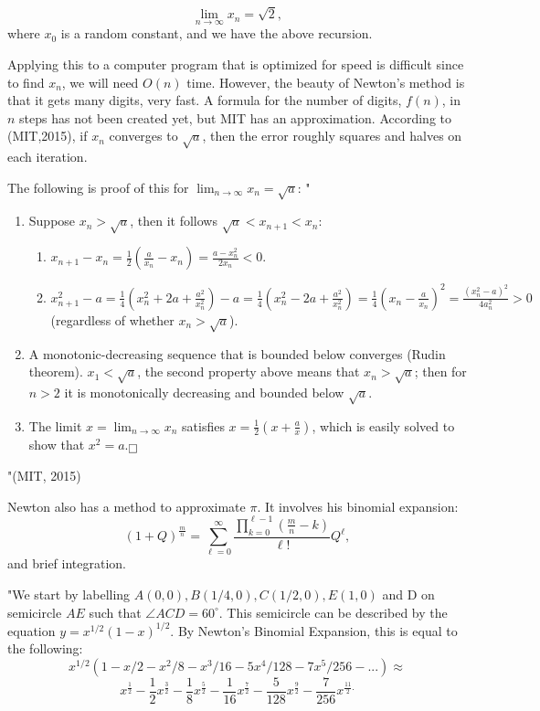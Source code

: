 \documentclass{article}
\begin{document}
$$\lim_{n\to \infty}x_n=\sqrt{2},$$
where $x_0$ is a random constant, and we have the above recursion. 
\par Applying this to a computer program that is optimized for speed is difficult since to find $x_n$, we will need $O(n)$ time. However, the beauty of Newton's method is that it gets many digits, very fast. A formula for the number of digits, $f(n)$, in $n$ steps has not been created yet, but MIT has an approximation. According to (MIT,2015), if $x_n$ converges to $\sqrt{a}$, then the error roughly squares and halves on each iteration.
\par The following is proof of this for $\lim_{n\to\infty}x_n=\sqrt{a}$: 
"\begin{enumerate}
    \item Suppose $x_n>\sqrt{a}$, then it follows $\sqrt{a}<x_{n+1}<x_n$:
        \begin{enumerate}
            \item $x_{n+1}-x_n=\frac{1}{2}(\frac{a}{x_n}-x_n)=\frac{a-x_n^2}{2x_n}<0$.
            \item $x_{n+1}^2-a=\frac{1}{4}(x_n^2+2a+\frac{a^2}{x_n^2})-a=\frac{1}{4}(x_n^2-2a+\frac{a^2}{x_n^2})=\frac{1}{4}(x_n-\frac{a}{x_n})^2=\frac{(x_n^2-a)^2}{4a_n^2}>0$ (regardless of whether $x_n>\sqrt{a}$). 
        \end{enumerate}
    \item A monotonic-decreasing sequence that is bounded below converges (Rudin theorem). $x_1<\sqrt{a}$, the second property above means that $x_n>\sqrt{a}$; then for $n>2$ it is monotonically decreasing and bounded below $\sqrt{a}$.
    \item The limit $x=\lim_{n\to\infty}x_n$ satisfies $x=\frac{1}{2}(x+\frac{a}{x})$, which is easily solved to show that $x^2=a$.$\fbox{}$
\end{enumerate}"(MIT, 2015)
\par Newton also has a method to approximate $\pi$. It involves his binomial expansion:
$$(1+Q)^{\frac{m}{n}}=\sum_{\ell=0}^{\infty}\frac{\prod_{k=0}^{\ell-1}(\frac{m}{n}-k)}{\ell!}Q^{\ell},$$
and brief integration.
\par "We start by labelling $A(0,0), B(1/4,0), C(1/2,0), E(1,0)$ and D on semicircle $AE$ such that $\angle ACD=60^{\circ}$. This semicircle can be described by the equation $y=x^{1/2}(1-x)^{1/2}$. By Newton's Binomial Expansion, this is equal to the following:
$$x^{1/2}(1-x/2-x^2/8-x^3/16-5x^4/128-7x^5/256-...)\approx$$
$$x^{\frac{1}{2}}-\frac{1}{2}x^{\frac{3}{2}}-\frac{1}{8}x^{\frac{5}{2}}-\frac{1}{16}x^{\frac72}-\frac{5}{128}x^{\frac92}-\frac{7}{256}x^{\frac{11}{2}.}$$
\end{document}
